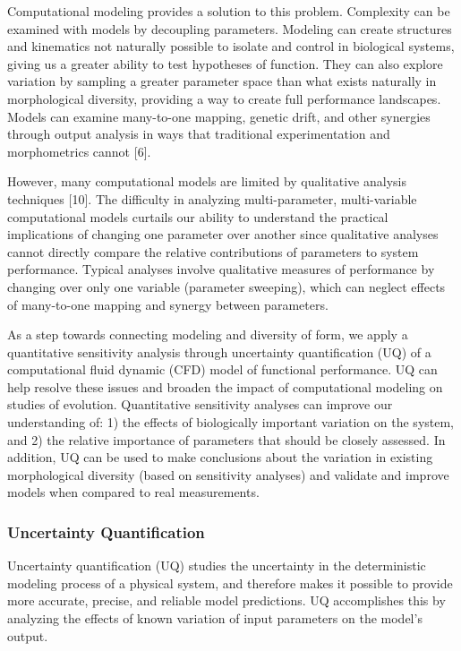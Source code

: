 \documentclass[
]{article}
\begin{document}
Computational modeling provides a solution to this problem. Complexity
can be examined with models by decoupling parameters. Modeling can
create structures and kinematics not naturally possible to isolate and
control in biological systems, giving us a greater ability to test
hypotheses of function. They can also explore variation by sampling a
greater parameter space than what exists naturally in morphological
diversity, providing a way to create full performance landscapes. Models
can examine many-to-one mapping, genetic drift, and other synergies
through output analysis in ways that traditional experimentation and
morphometrics cannot {[}6{]}.

However, many computational models are limited by qualitative analysis
techniques {[}10{]}. The difficulty in analyzing multi-parameter,
multi-variable computational models curtails our ability to understand
the practical implications of changing one parameter over another since
qualitative analyses cannot directly compare the relative contributions
of parameters to system performance. Typical analyses involve
qualitative measures of performance by changing over only one variable
(parameter sweeping), which can neglect effects of many-to-one mapping
and synergy between parameters.

As a step towards connecting modeling and diversity of form, we apply a
quantitative sensitivity analysis through uncertainty quantification
(UQ) of a computational fluid dynamic (CFD) model of functional
performance. UQ can help resolve these issues and broaden the impact of
computational modeling on studies of evolution. Quantitative sensitivity
analyses can improve our understanding of: 1) the effects of
biologically important variation on the system, and 2) the relative
importance of parameters that should be closely assessed. In addition,
UQ can be used to make conclusions about the variation in existing
morphological diversity (based on sensitivity analyses) and validate and
improve models when compared to real measurements.

\hypertarget{uncertainty-quantification}{%
\subsubsection{Uncertainty
Quantification}\label{uncertainty-quantification}}

Uncertainty quantification (UQ) studies the uncertainty in the
deterministic modeling process of a physical system, and therefore makes
it possible to provide more accurate, precise, and reliable model
predictions. UQ accomplishes this by analyzing the effects of known
variation of input parameters on the model's output.
\end{document}
